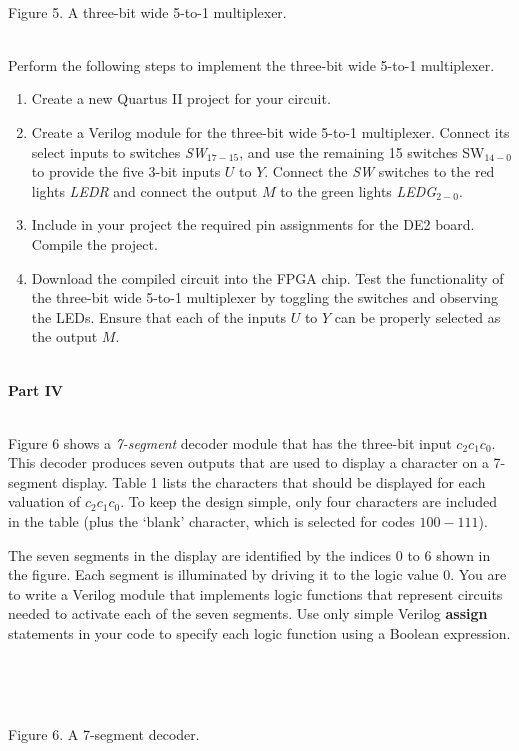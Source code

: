 \documentclass[psfig,10pt,fullpage]{article}
\begin{document}
\begin{figure}[H]
\scriptsize
\centerline{
\hbox{}}
\end{figure}
~\\
\centerline{Figure 5.  A three-bit wide 5-to-1 multiplexer.}
~\\

Perform the following steps to implement the three-bit wide 5-to-1 multiplexer.
\begin{enumerate}
\item Create a new Quartus II project for your circuit.
\item Create a Verilog module for the three-bit wide 5-to-1 multiplexer. Connect its select
inputs to switches {\it SW}$_{17-15}$, and use the remaining 15 switches SW$_{14-0}$ to
provide the five 3-bit inputs $U$ to $Y$. Connect the {\it SW} switches
to the red lights {\it LEDR} and connect the output $M$ to the green lights {\it LEDG}$_{2-0}$.
\item Include in your project the required pin assignments for the DE2 board.
Compile the project.
\item Download the compiled circuit into the FPGA chip. Test the functionality of the 
three-bit wide 5-to-1 multiplexer by toggling the switches and observing the LEDs. Ensure
that each of the inputs $U$ to $Y$ can be properly selected as the output $M$.
\end{enumerate}

~\\
\noindent
{\bf Part IV}

~\\
\noindent
Figure 6 shows a {\it 7-segment} decoder module that has the three-bit input $c_2 c_1
c_0$. This decoder produces seven outputs that are used to display a character on a
7-segment display. Table 1 lists the characters that should be displayed for each
valuation of $c_2 c_1 c_0$. To keep the design simple, only four characters
are included in the table (plus the `blank' character, which is selected for codes
$100-111$).

The seven segments in the display are identified by the indices 0 to 6 shown in the
figure. Each segment is illuminated by driving it to the logic value 0. You are to write a
Verilog module that implements logic functions that represent circuits needed to activate
each of the seven segments. Use only
simple Verilog {\bf assign} statements in your code to specify each logic function using a
Boolean expression. 

~\\
\begin{figure}[H]
\scriptsize
\centerline{
\hbox{}}
\end{figure}
~\\
\centerline{Figure 6.  A 7-segment decoder.}
~\\
\end{document}
